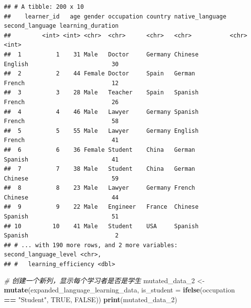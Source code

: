 \documentclass[]{book}
\newenvironment{Shaded}{\begin{snugshade}}{\end{snugshade}}
\newcommand{\CommentTok}[1]{\textcolor[rgb]{0.56,0.35,0.01}{\textit{#1}}}
\newcommand{\DataTypeTok}[1]{\textcolor[rgb]{0.13,0.29,0.53}{#1}}
\newcommand{\DecValTok}[1]{\textcolor[rgb]{0.00,0.00,0.81}{#1}}
\newcommand{\KeywordTok}[1]{\textcolor[rgb]{0.13,0.29,0.53}{\textbf{#1}}}
\newcommand{\NormalTok}[1]{#1}
\newcommand{\OperatorTok}[1]{\textcolor[rgb]{0.81,0.36,0.00}{\textbf{#1}}}
\newcommand{\OtherTok}[1]{\textcolor[rgb]{0.56,0.35,0.01}{#1}}
\newcommand{\StringTok}[1]{\textcolor[rgb]{0.31,0.60,0.02}{#1}}
\begin{document}
\begin{verbatim}
## # A tibble: 200 x 10
##    learner_id   age gender occupation country native_language second_language learning_duration
##         <int> <int> <chr>  <chr>      <chr>   <chr>           <chr>                       <int>
##  1          1    31 Male   Doctor     Germany Chinese         English                        30
##  2          2    44 Female Doctor     Spain   German          French                         12
##  3          3    28 Male   Teacher    Spain   Spanish         French                         26
##  4          4    46 Male   Lawyer     Germany Spanish         French                         58
##  5          5    55 Male   Lawyer     Germany English         French                         41
##  6          6    36 Female Student    China   German          Spanish                        41
##  7          7    38 Male   Student    China   German          Chinese                        59
##  8          8    23 Male   Lawyer     Germany French          Chinese                        44
##  9          9    22 Male   Engineer   France  Chinese         Spanish                        51
## 10         10    41 Male   Student    USA     Spanish         Spanish                         2
## # ... with 190 more rows, and 2 more variables: second_language_level <chr>,
## #   learning_efficiency <dbl>
\end{verbatim}

\begin{Shaded}
\begin{Highlighting}[]
\CommentTok{# 创建一个新列，显示每个学习者是否是学生}
\NormalTok{mutated_data_}\DecValTok{2}\NormalTok{ <-}\StringTok{ }\KeywordTok{mutate}\NormalTok{(expanded_language_learning_data, }\DataTypeTok{is_student =} \KeywordTok{ifelse}\NormalTok{(occupation }\OperatorTok{==}\StringTok{ "Student"}\NormalTok{, }\OtherTok{TRUE}\NormalTok{, }\OtherTok{FALSE}\NormalTok{))}
\KeywordTok{print}\NormalTok{(mutated_data_}\DecValTok{2}\NormalTok{)}
\end{Highlighting}
\end{Shaded}
\end{document}

